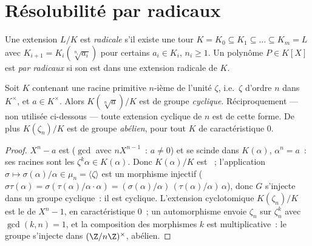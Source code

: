 \section{Résolubilité par radicaux}

\begin{definition}\label{def:b3:galois:radical}
Une extension $L/K$ est \emph{radicale}
s'il existe une tour $K = K_0 \subseteq K_1 \subseteq \dots
\subseteq K_m = L$ avec $K_{i+1} = K_i(\sqrt[n_i]{a_i})$ pour
certains $a_i \in K_i$, $n_i \geq 1$. Un polynôme $P \in K[X]$
est \emph{ par radicaux} si son 
est  dans une extension radicale de $K$.
\end{definition}

\begin{lemma}\label{lem:b3:galois:cyclicsteps}
Soit $K$ contenant une racine primitive $n$-ième de l'unité
$\zeta$, i.e.\ $\zeta$ d'ordre $n$ dans $K^\times$, et $a \in
K^\times$. Alors $K(\sqrt[n]a)/K$ est  de groupe
\emph{cyclique}. Réciproquement --- non utilisée ci-dessous ---
toute extension cyclique de  $n$ est de cette forme. De
plus $K(\zeta_n)/K$ est  de groupe \emph{abélien},
pour tout $K$ de caractéristique $0$.
\end{lemma}

\begin{proof}
$X^n - a$ est  ($\gcd$ avec $nX^{n-1}$~: $a \neq 0$)
et se scinde dans $K(\alpha)$, $\alpha^n = a$~: ses racines
sont les $\zeta^k\alpha \in K(\alpha)$. Donc $K(\alpha)/K$ est
~; l'application $\sigma \mapsto
\sigma(\alpha)/\alpha \in \mu_n = \langle \zeta\rangle$ est un
morphisme injectif ($\sigma\tau(\alpha) =
\sigma(\tau(\alpha)/\alpha \cdot \alpha) =
(\sigma(\alpha)/\alpha)\,(\tau(\alpha)/\alpha)\,\alpha$), donc
$G$ s'injecte dans un groupe cyclique~: il est cyclique.
L'extension cyclotomique $K(\zeta_n)/K$ est le  de $X^n - 1$,  en caractéristique $0$~;
un automorphisme envoie $\zeta_n$ sur $\zeta_n^k$ avec $\gcd(k,
n) = 1$, et la composition des morphismes $k$ est
multiplicative~: le groupe s'injecte dans $(\Z/n\Z)^\times$,
abélien.
\end{proof}

